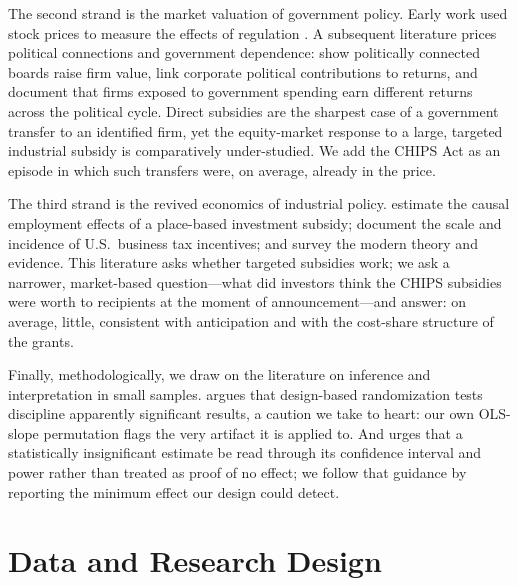 \documentclass[12pt]{article}
\begin{document}
The second strand is the market valuation of government policy. Early work used stock prices to
measure the effects of regulation \citep{schwert1981,binder1985}. A subsequent literature prices
political connections and government dependence: \citet{goldman2009} show politically connected
boards raise firm value, \citet{cooper2010} link corporate political contributions to returns, and
\citet{belo2013} document that firms exposed to government spending earn different returns across
the political cycle. Direct subsidies are the sharpest case of a government transfer to an
identified firm, yet the equity-market response to a large, targeted industrial subsidy is
comparatively under-studied. We add the CHIPS Act as an episode in which such transfers were, on
average, already in the price.

The third strand is the revived economics of industrial policy. \citet{criscuolo2019} estimate the
causal employment effects of a place-based investment subsidy; \citet{slattery2020} document the
scale and incidence of U.S.\ business tax incentives; and \citet{juhasz2024} survey the modern
theory and evidence. This literature asks whether targeted subsidies work; we ask a narrower,
market-based question---what did investors think the CHIPS subsidies were worth to recipients at
the moment of announcement---and answer: on average, little, consistent with anticipation and with
the cost-share structure of the grants.

Finally, methodologically, we draw on the literature on inference and interpretation in small
samples. \citet{young2019} argues that design-based randomization tests discipline apparently
significant results, a caution we take to heart: our own OLS-slope permutation flags the very
artifact it is applied to. And \citet{abadie2020} urges that a statistically insignificant estimate
be read through its confidence interval and power rather than treated as proof of no effect; we
follow that guidance by reporting the minimum effect our design could detect.

\section{Data and Research Design}\label{sec:data}
\end{document}
